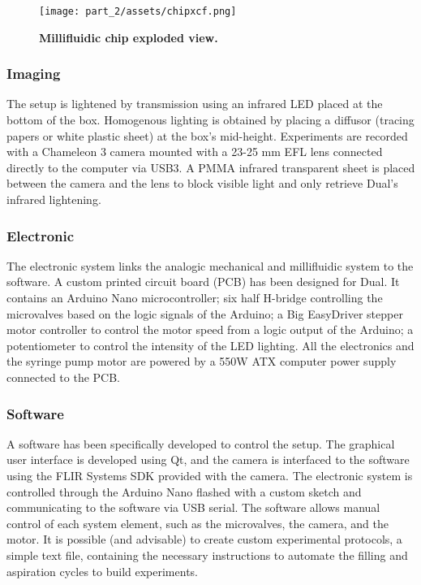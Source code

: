     \begin{figure}[h!]
      \centering
      \texttt{[image: part\_2/assets/chipxcf.png]}
      \caption{\textbf{Millifluidic chip exploded view.}}
      \label{dual_chip_visu}
    \end{figure}

  \subsubsection{Imaging}
  The setup is lightened by transmission using an infrared LED placed at the bottom of the box. Homogenous lighting is obtained by placing a diffusor (tracing papers or white plastic sheet) at the box's mid-height. Experiments are recorded with a Chameleon 3 camera mounted with a 23-25 mm EFL lens connected directly to the computer via USB3. A PMMA infrared transparent sheet is placed between the camera and the lens to block visible light and only retrieve Dual's infrared lightening.

  \subsubsection{Electronic}
  The electronic system links the analogic mechanical and millifluidic system to the software. A custom printed circuit board (PCB) has been designed for Dual. It contains an Arduino Nano microcontroller; six half H-bridge controlling the microvalves based on the logic signals of the Arduino; a Big EasyDriver stepper motor controller to control the motor speed from a logic output of the Arduino; a potentiometer to control the intensity of the LED lighting. All the electronics and the syringe pump motor are powered by a 550W ATX computer power supply connected to the PCB.

  \subsubsection{Software}
  A software has been specifically developed to control the setup. The graphical user interface is developed using Qt, and the camera is interfaced to the software using the FLIR Systems SDK provided with the camera. The electronic system is controlled through the Arduino Nano flashed with a custom sketch and communicating to the software via USB serial. The software allows manual control of each system element, such as the microvalves, the camera, and the motor. It is possible (and advisable) to create custom experimental protocols, a simple text file, containing the necessary instructions to automate the filling and aspiration cycles to build experiments.

